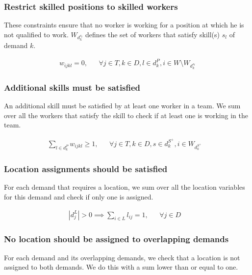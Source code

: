 \documentclass[../../thesis.tex]{subfiles}
\begin{document}
\subsubsection{Restrict skilled positions to skilled workers}

These constraints ensure that no worker is working for a position at which he is not qualified to work.
$W_{d^{s_l}_k}$ defines the set of workers that satisfy skill(s) $s_l$ of demand $k$. 

\begin{align}
  w_{ijkl} = 0, && \forall j \in T, k \in D, l \in d^P_k, i \in W \setminus W_{d^{s_l}_k}  \label{wc6}
\end{align}

\subsubsection{Additional skills must be satisfied}

An additional skill must be satisfied by at least one worker in a team. We sum 
over all the workers that satisfy the skill to check if at least one is working in the team.

\begin{align}
  \sum_{l \in d_k^P} w_{ijkl} \geq 1, && \forall j \in T, k \in D, s \in d^{S^+}_k, i \in W_{d^{S^+}_k}& \label{wc8}
\end{align}


\subsubsection{Location assignments should be satisfied}

For each demand that requires a location, we sum over all the location variables for this demand and check if only one is assigned.

\begin{align}
  |d^L_j| > 0 \implies \sum_{i \in L} l_{ij} = 1, && \forall j \in D& \label{lc2}
\end{align}

\subsubsection{No location should be assigned to overlapping demands}

For each demand and its overlapping demands, we check that a location is not assigned to both demands.
We do this with a sum lower than or equal to one.
\end{document}
